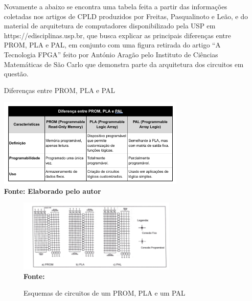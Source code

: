 Novamente a abaixo se encontra uma tabela  feita a partir das informações coletadas nos artigos de CPLD produzidos por Freitas, Pasqualinoto e Leão, e do material de arquitetura de computadores disponibilizado pela USP em https://edisciplinas.usp.br, que busca explicar as principais diferenças entre PROM, PLA e PAL,  em conjunto com uma figura retirada do artigo “A Tecnologia FPGA” feito por António Aragão pelo Instituto de Ciências Matemáticas de São Carlo que demonstra parte da arquitetura dos circuitos em questão.

\begin{quadro}[H]
	\centering	
	\caption{Diferenças entre PROM, PLA e PAL}
	\vspace{-0.4cm}
	\includegraphics[width=0.7\textwidth]{figuras/Tabela1.png}
	 \vspace{-0.2cm}
	\\\textbf{\footnotesize Fonte: Elaborado pelo autor }
	\label{table: Tabela1}
\end{quadro}
\vspace{-0.5cm}
   
\begin{figure}[H]
	\centering	
	\caption{Esquemas de circuitos de um PROM, PLA e um PAL}
	\vspace{-0.4cm}
	\includegraphics[width=0.7\textwidth]{figuras/Figura3.png}
	 \vspace{-0.2cm}
	\\\textbf{\footnotesize Fonte:  }
	\label{fig:figura3}
\end{figure}
\vspace{-0.5cm}

